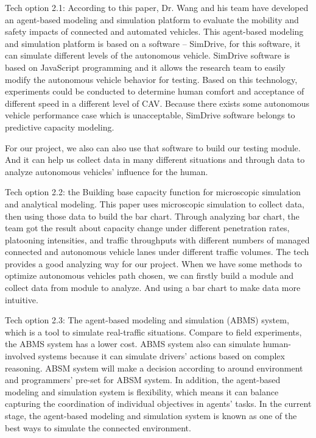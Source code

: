 \documentclass[onecolumn, draftclsnofoot,10pt, compsoc]{IEEEtran}
\begin{document}
Tech option 2.1: According to this paper, Dr. Wang and his team have developed an agent-based modeling and simulation platform to evaluate the mobility and safety impacts of connected and automated vehicles.
This agent-based modeling and simulation platform is based on a software – SimDrive, for this software, it can simulate different levels of the autonomous vehicle.
SimDrive software is based on JavaScript programming and it allows the research team to easily modify the autonomous vehicle behavior for testing.
Based on this technology, experiments could be conducted to determine human comfort and acceptance of different speed in a different level of CAV.
Because there exists some autonomous vehicle performance case which is unacceptable, SimDrive software belongs to predictive capacity modeling.

For our project, we also can also use that software to build our testing module.
And it can help us collect data in many different situations and through data to analyze autonomous vehicles’ influence for the human.

Tech option 2.2: the Building base capacity function for microscopic simulation and analytical modeling.
This paper uses microscopic simulation to collect data, then using those data to build the bar chart.
Through analyzing bar chart, the team got the result about capacity change under different penetration rates, platooning intensities, and traffic throughputs with different numbers of managed connected and autonomous vehicle lanes under different traffic volumes.
The tech provides a good analyzing way for our project.
When we have some methods to optimize autonomous vehicles path chosen, we can firstly build a module and collect data from module to analyze.
And using a bar chart to make data more intuitive.

Tech option 2.3: The agent-based modeling and simulation (ABMS) system, which is a tool to simulate real-traffic situations.
Compare to field experiments, the ABMS system has a lower cost.
ABMS system also can simulate human-involved systems because it can simulate drivers’ actions based on complex reasoning.
ABSM system will make a decision according to around environment and programmers’ pre-set for ABSM system.
In addition, the agent-based modeling and simulation system is flexibility, which means it can balance capturing the coordination of individual objectives in agents’ tasks.
In the current stage, the agent-based modeling and simulation system is known as one of the best ways to simulate the connected environment.
\end{document}
